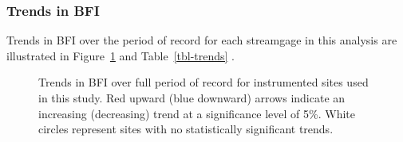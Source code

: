 \documentclass[
]{agujournal2019}
\begin{document}
\subsubsection{Trends in BFI}\label{sec-bfi-trends}

Trends in BFI over the period of record for each streamgage in this
analysis are illustrated in Figure~\ref{fig-instrumented-trend} and
Table~\ref{tbl-trends} .

\begin{figure}


\caption{\label{fig-instrumented-trend}Trends in BFI over full period of
record for instrumented sites used in this study. Red upward (blue
downward) arrows indicate an increasing (decreasing) trend at a
significance level of 5\%. White circles represent sites with no
statistically significant trends.}

\end{figure}%
\end{document}
